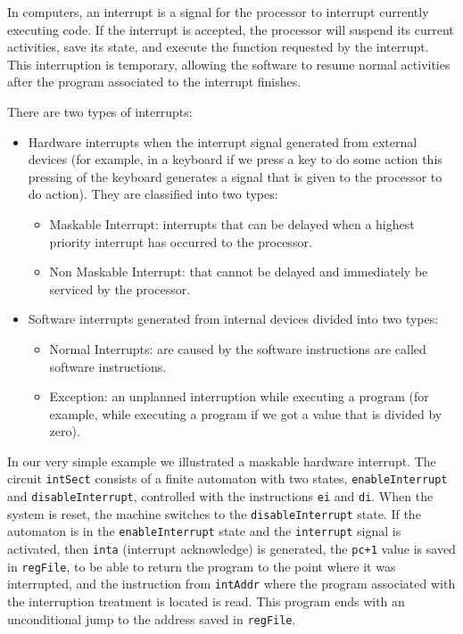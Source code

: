 In  computers, an interrupt  is a signal for the processor to interrupt currently executing code. If the interrupt is accepted, the processor will suspend its current activities, save its state, and execute the function requested by the interrupt.  This interruption is  temporary, allowing the software to resume normal activities after the program associated to the interrupt finishes.

There are two types of interrupts:
\begin{itemize}
\item Hardware interrupts
when the interrupt signal generated from external devices (for example, in a keyboard if we press a key to do some action this pressing of the keyboard generates a signal that is given to the processor to do action). They are classified into two types:
\begin{itemize}
    \item Maskable Interrupt: interrupts that can be delayed when a highest priority interrupt has occurred to the processor.

    \item Non Maskable Interrupt: that cannot be delayed and immediately be serviced by the processor.
\end{itemize}
\item Software interrupts generated from internal devices  divided into two types:
\begin{itemize}
    \item Normal Interrupts: are caused by the software instructions are called software instructions.
    \item Exception: an unplanned interruption while executing a program (for example, while executing a program if we got a value that is divided by zero).
\end{itemize}
\end{itemize}

In our very simple example we illustrated a maskable hardware interrupt. The circuit {\tt intSect} consists of a finite automaton with two states, {\tt enableInterrupt} and {\tt disableInterrupt}, controlled with the instructions {\tt ei} and {\tt di}. When the system is reset, the machine switches to the {\tt disableInterrupt} state. If the automaton is in the {\tt enableInterrupt} state and the {\tt interrupt} signal is activated, then {\tt inta} (interrupt acknowledge) is generated, the {\tt pc+1} value is saved in {\tt regFile}, to be able to return the program to the point where it was interrupted, and  the instruction from {\tt intAddr} where the program associated with the interruption treatment is located is read. This program ends with an unconditional jump to the address saved in {\tt regFile}.

